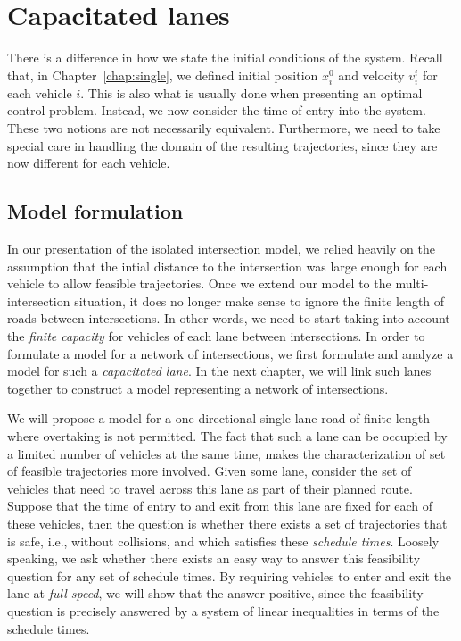 \documentclass[a4paper]{report}
\theoremstyle{definition}
\theoremstyle{plain}
\newcommand\note[1]{{\color{Navy}\noindent#1}}
\begin{document}
\chapter{Capacitated lanes}\label{chap:network}

\note{
There is a difference in how we state the initial conditions of the system.
%
Recall that, in Chapter~\ref{chap:single}, we defined initial position
$x_{i}^{0}$ and velocity $v_{i}^{i}$ for each vehicle $i$.
This is also what is usually done when presenting an optimal control problem.
%
Instead, we now consider the time of entry into the system.
%
These two notions are not necessarily equivalent.
%
Furthermore, we need to take special care in handling the domain of the
resulting trajectories, since they are now different for each vehicle.
}

\section{Model formulation}

In our presentation of the isolated intersection model, we relied heavily on the
assumption that the intial distance to the intersection was large enough for
each vehicle to allow feasible trajectories.
%
Once we extend our model to the multi-intersection situation, it does no longer
make sense to ignore the finite length of roads between intersections. In other
words, we need to start taking into account the \emph{finite capacity} for
vehicles of each lane between intersections.
%
In order to formulate a model for a network of intersections, we first formulate
and analyze a model for such a \emph{capacitated lane}.
%
In the next chapter, we will link such lanes together to construct a model
representing a network of intersections.

We will propose a model for a one-directional single-lane road of finite length
where overtaking is not permitted.
%
The fact that such a lane can be occupied by a limited number of vehicles at the
same time, makes the characterization of set of feasible trajectories more
involved.
%
Given some lane, consider the set of vehicles that need to travel across this
lane as part of their planned route. Suppose that the time of entry to and exit
from this lane are fixed for each of these vehicles, then the question is
whether there exists a set of trajectories that is safe, i.e., without
collisions, and which satisfies these \emph{schedule times}.
%
Loosely speaking, we ask whether there exists an easy way to answer this
feasibility question for any set of schedule times.
%
By requiring vehicles to enter and exit the lane at \emph{full speed}, we will show
that the answer positive, since the feasibility question is precisely answered
by a system of linear inequalities in terms of the schedule times.
\end{document}
